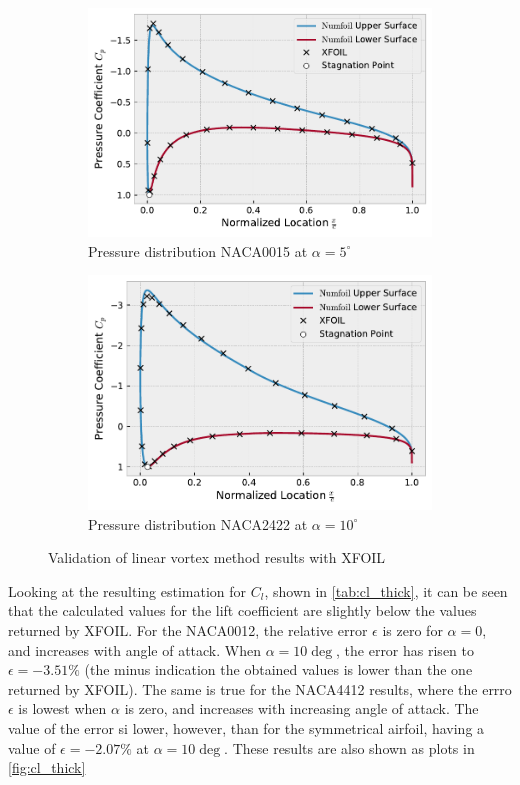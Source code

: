 \begin{figure}[h]
    \centering
    \begin{subfigure}{.5\textwidth}
      \centering
      \includegraphics[width=.9\linewidth]{static/thick_verif_naca0015_alpha5.pdf}
      \caption{Pressure distribution NACA0015 at $\alpha = 5^{\circ}$}
      \label{fig:thick_verif1}
    \end{subfigure}%
    \begin{subfigure}{.5\textwidth}
      \centering
      \includegraphics[width=.9\linewidth]{static/thick_verif_naca2422_alpha10.pdf}
      \caption{Pressure distribution NACA2422 at $\alpha = 10^{\circ}$}
      \label{fig:thick_verif2}
    \end{subfigure}
    \caption{\centering Validation of linear vortex method results with XFOIL\cite{xfoil}}
    \label{fig:thick_verif}
\end{figure}


Looking at the resulting estimation for $C_l$, shown in \autoref{tab:cl_thick},
it can be seen that the calculated values for the lift coefficient are slightly
below the values returned by XFOIL. For the NACA0012, the relative error
$\epsilon$ is zero for $\alpha=0$, and increases with angle of attack. When
$\alpha=10\deg$, the error has risen to $\epsilon=-3.51\%$ (the minus indication
the obtained values is lower than the one returned by XFOIL). The same is true
for the NACA4412 results, where the errro $\epsilon$ is lowest when $\alpha$ is
zero, and increases with increasing angle of attack. The value of the error si
lower, however, than for the symmetrical airfoil, having a value of
$\epsilon=-2.07\%$ at $\alpha=10\deg$. These results are also shown as plots in \autoref{fig:cl_thick}

